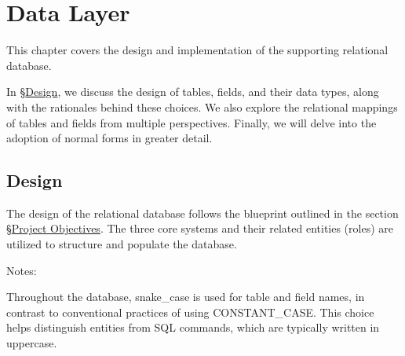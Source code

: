 \documentclass[12pt]{report}
\newcommand{\n}{\par}
\newcommand{\br}{\n\vspace{1 em}\n}
\begin{document}
\chapter{Data Layer} \label{data-layer}
This chapter covers the design and implementation of the supporting relational database.
\br
In \S \hyperref[data-layer.design]{Design}, we discuss the design of tables, fields, and their data types, along with the rationales behind these choices. We also explore the relational mappings of tables and fields from multiple perspectives. Finally, we will delve into the adoption of normal forms in greater detail.
\br



\section{Design} \label{data-layer.design}
The design of the relational database follows the blueprint outlined in the section \S \hyperref[overview.project-objectives]{Project Objectives}.
The three core systems and their related entities (roles) are utilized to structure and populate the database.
\br
Notes:\n
Throughout the database, snake\_case is used for table and field names, in contrast to conventional practices of using CONSTANT\_CASE.
This choice helps distinguish entities from SQL commands, which are typically written in uppercase.
\end{document}
